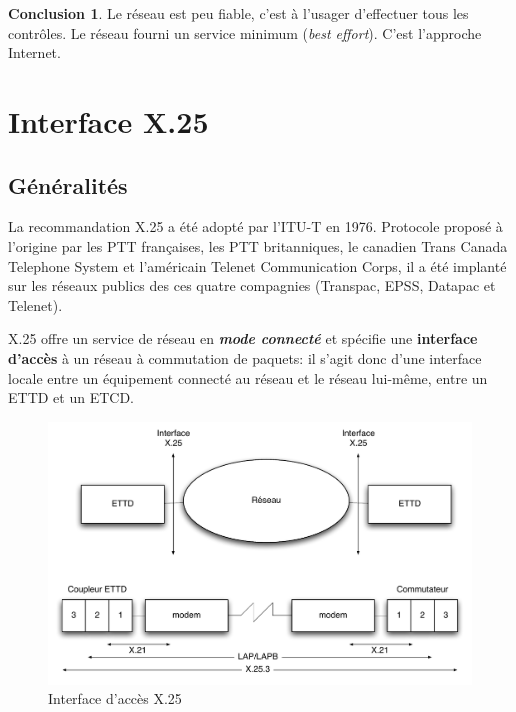\documentclass[11pt,english,french]{scrreprt}
\theoremstyle{remark}
\theoremstyle{definition}
\newtheorem*{conc*}{Conclusion}
\begin{document}
\begin{conc*}
	Le réseau est peu fiable, c'est à l'usager d'effectuer tous les contrôles. Le réseau fourni un service minimum (\emph{best effort}). C'est l'approche Internet.
\end{conc*}

\section{Interface X.25} %
\subsection{Généralités} %

La recommandation X.25 a été adopté par l'ITU-T en 1976. Protocole proposé à l'origine par les PTT françaises, les PTT britanniques, le canadien Trans Canada Telephone System et l'américain Telenet Communication Corps, il a été implanté sur les réseaux publics des ces quatre compagnies (Transpac, EPSS, Datapac et Telenet).

X.25 offre un service de réseau en \emph{\textbf{mode connecté}} et spécifie une \textbf{interface d'accès} à un réseau à commutation de paquets: il s'agit donc d'une interface locale entre un équipement connecté au réseau et le réseau lui-même, entre un ETTD et un ETCD.

\begin{figure}[h!]
	\center
	\includegraphics[scale=.65]{graphes/X25}
	\caption{Interface d'accès X.25}
\end{figure}
\end{document}
